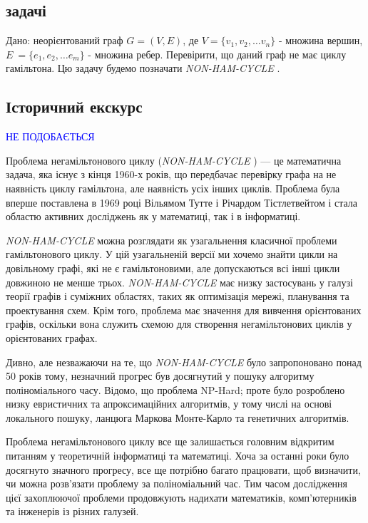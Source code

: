 \documentclass[14pt]{article}
\begin{document}
\begin{spacing}{1.175}
        \newcommand{\nonhamcycle}{\textit{NON-HAM-CYCLE }}
        \newcommand{\hamcycle}{\textit{HAM-CYCLE }}
        \newcommand{\dhampath}{\textit{D-HAM-PATH }}
        \newcommand{\tsat}{\textit{3SAT }}
        \newcommand{\bolddot}{\textbf{.}}

        
        \subsection{ задачі}
        \quad Дано: неорієнтований граф \(G = (V,E)\), де \(V = \{v_1, v_2, \dots v_n\}\) - множина вершин, \(E\ = \{e_1, e_2, \dots e_m\}\) - множина ребер. Перевірити, що даний граф не має циклу гамільтона. Цю задачу будемо позначати \nonhamcycle .    
        \subsection{\normalfont Історичний екскурс}
        \textcolor{blue}{НЕ ПОДОБАЄТЬСЯ}
        
        Проблема негамільтонового циклу (\nonhamcycle) — це математична задача, яка існує з кінця 1960-х років, що передбачає перевірку графа на не наявність циклу гамільтона, але наявність усіх інших циклів. Проблема була вперше поставлена в 1969 році Вільямом Тутте і Річардом Тістлетвейтом і стала областю активних досліджень як у математиці, так і в інформатиці.

        \nonhamcycle можна розглядати як узагальнення класичної проблеми гамільтонового циклу. У цій узагальненій версії ми хочемо знайти цикли на довільному графі, які не є гамільтоновими, але допускаються всі інші цикли довжиною не менше трьох. \nonhamcycle має низку застосувань у галузі теорії графів і суміжних областях, таких як оптимізація мережі, планування та проектування схем. Крім того, проблема має значення для вивчення орієнтованих графів, оскільки вона служить схемою для створення негамільтонових циклів у орієнтованих графах.

        Дивно, але незважаючи на те, що \nonhamcycle було запропоновано понад 50 років тому, незначний прогрес був досягнутий у пошуку алгоритму поліноміального часу. Відомо, що проблема NP-Hard; проте було розроблено низку евристичних та апроксимаційних алгоритмів, у тому числі на основі локального пошуку, ланцюга Маркова Монте-Карло та генетичних алгоритмів.

        Проблема негамільтонового циклу все ще залишається головним відкритим питанням у теоретичній інформатиці та математиці. Хоча за останні роки було досягнуто значного прогресу, все ще потрібно багато працювати, щоб визначити, чи можна розв’язати проблему за поліноміальний час. Тим часом дослідження цієї захоплюючої проблеми продовжують надихати математиків, комп’ютерників та інженерів із різних галузей.
    

\end{spacing}
\end{document}
